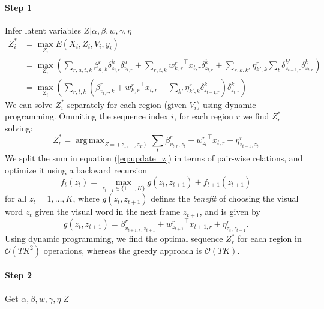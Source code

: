 \documentclass[10pt,letterpaper]{article}
\DeclareMathOperator*{\argmax}{arg\,max}
\newcommand{\+}[1]{\ensuremath{{\boldsymbol #1}}}
\begin{document}
\paragraph{Step 1} Infer latent variables $Z|\alpha, \beta, w, \gamma, \eta$
\begin{align}
  Z_i^* & = \max_{Z_i} E(X_i, Z_i, V_i, y_i) \\
  & = \max_{Z_i} \left( \sum_{r,a,t,k} \beta^r_{a,k} \delta_{z_{t,r}}^{k} \delta_{v_{t,r}}^{a}
    + \sum_{r,t,k} {w^r_{k,r}}^\top x_{t,r} \delta_{z_{t,r}}^{k} +\sum_{r,k,k'} \eta^r_{k',k}\sum_{t} \delta_{z_{t-1,r}}^{k'} \delta_{z_{t,r}}^{k} \right) \\
  & = \max_{Z_i} \left( \sum_{r,t,k} \left( \beta^r_{v_{t,r},k}  
    +  {w^r_{k,r}}^\top x_{t,r} + \sum_{k'} \eta^r_{k',k}\delta_{z_{t-1,r}}^{k'} \right)\delta_{z_{t,r}}^{k} \right) 
\end{align}
We can solve $Z_i^*$ separately for each region (given $V_i$) using dynamic programming. Ommiting the sequence index $i$, for each region $r$ we find $Z_r^*$ solving:
\begin{equation}
\label{eq:update_z}
  Z_{r}^* = \argmax_{Z=(z_1,\dots,z_T)} \sum_t \beta^r_{v_{t,r},z_t} +  {w^r_{z_t}}^\top x_{t,r} + \eta^r_{z_{t-1},z_t} 
\end{equation}
We split the sum in equation (\ref{eq:update_z}) in terms of pair-wise relations, and optimize it using a backward recursion
\begin{equation}
f_t(z_t) = \max_{z_{t+1} \in \{1,\dots,K\}} g(z_t,z_{t+1}) + f_{t+1}(z_{t+1})
\end{equation}
for all $z_t = 1,\dots,K$, where $g(z_t,z_{t+1})$ defines the \emph{benefit} of choosing the visual word $z_{t}$ given the visual word in the next frame $z_{t+1}$, and is given by
\begin{equation}
g(z_t,z_{t+1}) = \beta^r_{v_{t+1,r},z_{t+1}} +  {w^r_{z_{t+1}}}^\top x_{t+1,r} + \eta^r_{z_t,z_{t+1}} .
\end{equation}
Using dynamic programming, we find the optimal sequence $Z_r^*$ for each region in $\mathcal{O}(TK^2)$ operations, whereas the greedy approach is $\mathcal{O}(TK)$.


\paragraph{Step 2} Get $\alpha, \beta, w, \gamma, \eta| Z$

\vspace{0.3cm}
\end{document}
